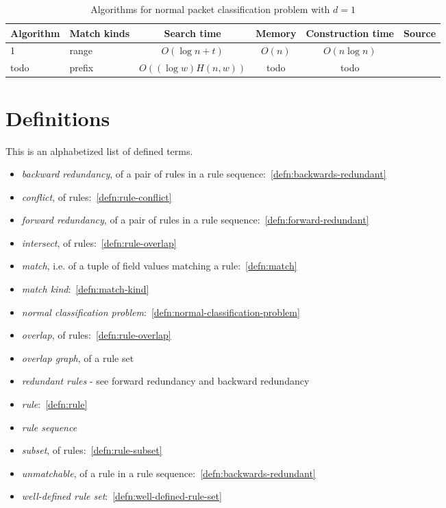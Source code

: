 \documentclass[acmsmall]{acmart}
\begin{document}
\begin{table*}
  \caption{Algorithms for normal packet classification problem with $d=1$}
  \label{tab:summarylpm}
  \begin{tabular}{llcccl}
    \toprule
    
      Algorithm
    & Match kinds
    & Search time
    & Memory
    & Construction time
    & Source \\
    
    \midrule

      1
    & range
    & $O(\log n + t)$
    & $O(n)$
    & $O(n \log n)$
    & \cite[Thm. 3.2]{Edel1983a}
    \\

      todo
    & prefix
    & $O((\log w) H(n,w))$
    & todo
    & todo
    & \cite{WVTP1997}
    \\

  \bottomrule
\end{tabular}
\end{table*}


\section{Definitions}

This is an alphabetized list of defined terms.
\begin{itemize}
\item {\em backward redundancy}, of a pair of rules in a rule sequence:~\ref{defn:backwards-redundant}
\item {\em conflict}, of rules:~\ref{defn:rule-conflict}
\item {\em forward redundancy}, of a pair of rules in a rule sequence:~\ref{defn:forward-redundant}
\item {\em intersect}, of rules:~\ref{defn:rule-overlap}
\item {\em match}, i.e. of a tuple of field values matching a rule:~\ref{defn:match}
\item {\em match kind}:~\ref{defn:match-kind}
\item {\em normal classification problem}:~\ref{defn:normal-classification-problem}
\item {\em overlap}, of rules:~\ref{defn:rule-overlap}
\item {\em overlap graph}, of a rule set
\item {\em redundant rules} - see forward redundancy and backward redundancy
\item {\em rule}:~\ref{defn:rule}
\item {\em rule sequence}
\item {\em subset}, of rules:~\ref{defn:rule-subset}
\item {\em unmatchable}, of a rule in a rule sequence:~\ref{defn:backwards-redundant}
\item {\em well-defined rule set}:~\ref{defn:well-defined-rule-set}
\end{itemize}
\end{document}
